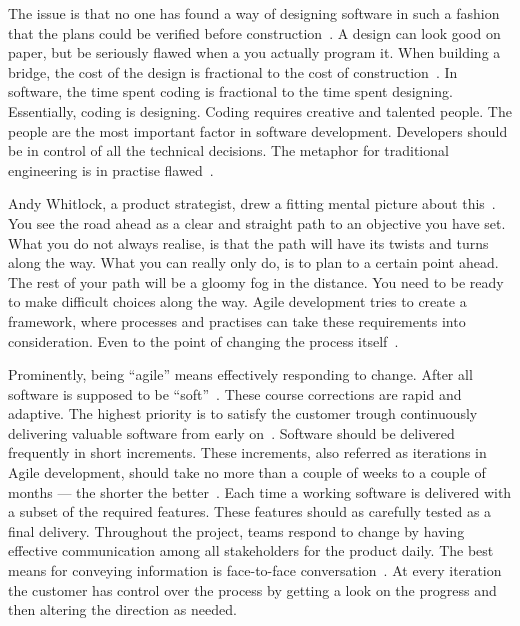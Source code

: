 \documentclass[english]{tktltiki2}
\begin{document}
The issue is that no one has found a way of designing software in such a fashion that the plans could be verified before construction~\cite{Fow05}. A design can look good on paper, but be seriously flawed when a you actually program it. When building a bridge, the cost of the design is fractional to the cost of construction~\cite{Fow05}. In software, the time spent coding is fractional to the time spent designing. Essentially, coding is designing. Coding requires creative and talented people. The people are the most important factor in software development. Developers should be in control of all the technical decisions. The metaphor for traditional engineering is in practise flawed~\cite{Fow05}.

Andy Whitlock, a product strategist, drew a fitting mental picture about this~\cite{Whi14}. You see the road ahead as a clear and straight path to an objective you have set. What you do not always realise, is that the path will have its twists and turns along the way. What you can really only do, is to plan to a certain point ahead. The rest of your path will be a gloomy fog in the distance. You need to be ready to make difficult choices along the way. Agile development tries to create a framework, where processes and practises can take these requirements into consideration. Even to the point of changing the process itself~\cite{Fow05}.

Prominently, being “agile” means effectively responding to change. After all software is supposed to be “soft”~\cite{Fow05}. These course corrections are rapid and adaptive. The highest priority is to satisfy the customer trough continuously delivering valuable software from early on~\cite{BBB01b}. Software should be delivered frequently in short increments. These increments, also referred as iterations in Agile development, should take no more than a couple of weeks to a couple of months — the shorter the better~\cite{Fow05}. Each time a working software is delivered with a subset of the required features. These features should as carefully tested as a final delivery. Throughout the project, teams respond to change by having effective communication among all stakeholders for the product daily. The best means for conveying information is face-to-face conversation~\cite{BBB01b}. At every iteration the customer has control over the process by getting a look on the progress and then altering the direction as needed.
\end{document}
